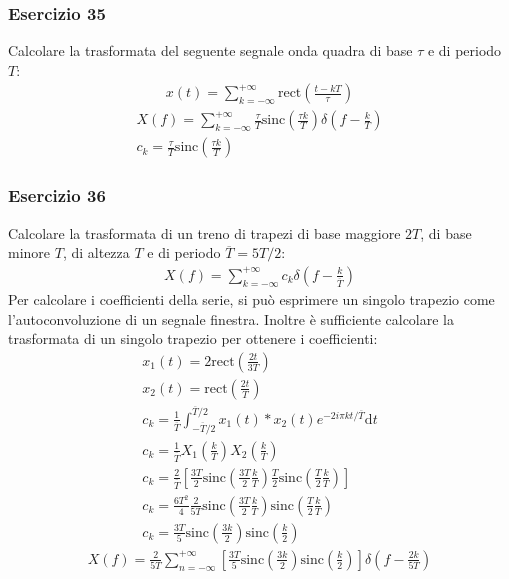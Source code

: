 \documentclass{article}
\newcommand{\rect}{\mathrm{rect}}
\newcommand{\sinc}{\mathrm{sinc}}
\newcommand{\df}{\mathrm{d}}
\begin{document}
\subsubsection*{Esercizio 35}

Calcolare la trasformata del seguente segnale onda quadra di base $\tau$ e di periodo $T$:
\begin{gather*}
    x(t)=\displaystyle\sum_{k=-\infty}^{+\infty}\rect\left(\frac{t-kT}{\tau}\right)
\end{gather*}
\begin{gather}
    X(f)=\displaystyle\sum_{k=-\infty}^{+\infty}\frac{\tau}{T}\sinc\left(\frac{\tau k}{T}\right)\delta\left(f-\frac{k}{T}\right)\\
    c_k=\displaystyle\frac{\tau}{T}\sinc\left(\frac{\tau k}{T}\right)
\end{gather}

\subsubsection*{Esercizio 36}

Calcolare la trasformata di un treno di trapezi di base maggiore $2T$, di base minore $T$, di altezza $T$ e di periodo $\overline T=5T/2$:
\begin{gather*}
    X(f)=\displaystyle\sum_{k=-\infty}^{+\infty}c_k\delta\left(f-\frac{k}{\overline T}\right)
\end{gather*}
Per calcolare i coefficienti della serie, si può esprimere un singolo trapezio come l'autoconvoluzione di un segnale finestra. Inoltre è sufficiente calcolare la 
trasformata di un singolo trapezio per ottenere i coefficienti:
\begin{gather*}
    x_1(t)=2\displaystyle\rect\left(\frac{2t}{3T}\right)\\
    x_2(t)=\displaystyle\rect\left(\frac{2t}{T}\right)\\
    c_k=\displaystyle\frac{1}{\overline T}\int_{-\overline T/2}^{\overline T/2}x_1(t)*x_2(t)e^{-2i\pi kt/\overline T}\df t\\
    c_k=\displaystyle\frac{1}{\overline T}X_1\left(\frac{k}{ T}\right)X_2\left(\frac{k}{ T}\right)\\
    c_k=\displaystyle\frac{2}{\overline T}\left[\frac{3T}{2}\sinc\left(\frac{3T}{2}\frac{k}{ T}\right)\frac{T}{2}\sinc\left(\frac{T}{2}\frac{k}{ T}\right)\right]\\
    c_k=\displaystyle\frac{6T^2}{4}\frac{2}{5T}\sinc\left(\frac{3T}{2}\frac{k}{ T}\right)\sinc\left(\frac{T}{2}\frac{k}{ T}\right)\\
    c_k=\displaystyle\frac{3T}{5}\sinc\left(\frac{3k}{2}\right)\sinc\left(\frac{k}{2}\right)
\end{gather*}
\begin{gather}
    X(f)=\displaystyle\frac{2}{5T}\sum_{n=-\infty}^{+\infty}\left[\frac{3T}{5}\sinc\left(\frac{3k}{2}\right)\sinc\left(\frac{k}{2}\right)\right]\delta\left(f-\frac{2k}{5T}\right)
\end{gather}
\end{document}
